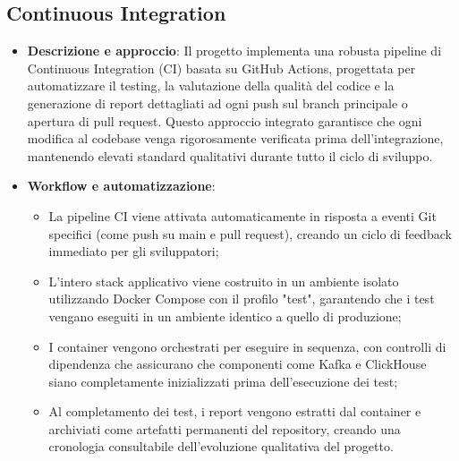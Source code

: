 \documentclass[10pt]{article}
\begin{document}
\subsection{Continuous Integration}
    \begin{itemize} 
    \item \textbf{Descrizione e approccio}: Il progetto implementa una robusta pipeline di Continuous Integration (CI) basata su GitHub Actions, progettata per automatizzare il testing, la valutazione della qualità del codice e la generazione di report dettagliati ad ogni push sul branch principale o apertura di pull request. Questo approccio integrato garantisce che ogni modifica al codebase venga rigorosamente verificata prima dell'integrazione, mantenendo elevati standard qualitativi durante tutto il ciclo di sviluppo.
    
    \item \textbf{Workflow e automatizzazione}:
    \begin{itemize}
        \item La pipeline CI viene attivata automaticamente in risposta a eventi Git specifici (come push su main e pull request), creando un ciclo di feedback immediato per gli sviluppatori;
        \item L'intero stack applicativo viene costruito in un ambiente isolato utilizzando Docker Compose con il profilo "test", garantendo che i test vengano eseguiti in un ambiente identico a quello di produzione;
        \item I container vengono orchestrati per eseguire in sequenza, con controlli di dipendenza che assicurano che componenti come Kafka e ClickHouse siano completamente inizializzati prima dell'esecuzione dei test;
        \item Al completamento dei test, i report vengono estratti dal container e archiviati come artefatti permanenti del repository, creando una cronologia consultabile dell'evoluzione qualitativa del progetto.
    \end{itemize}
    

\end{itemize}
\end{document}
